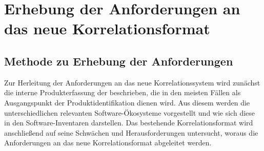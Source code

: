 \chapter{Erhebung der Anforderungen an das neue Korrelationsformat}\label{ch:anforderungen}


\section{Methode zu Erhebung der Anforderungen}

Zur Herleitung der Anforderungen an das neue Korrelationssystem wird zunächst die interne Produkterfassung der \metaeffektsp beschrieben, die in den meisten Fällen als Ausgangspunkt der Produktidentifikation dienen wird.
Aus diesem werden die unterschiedlichen relevanten Software-Ökosysteme vorgestellt und wie sich diese in den Software-Inventaren darstellen.
Das bestehende Korrelationsformat wird anschließend auf seine Schwächen und Herausforderungen untersucht, woraus die Anforderungen an das neue Korrelationsformat abgeleitet werden.











